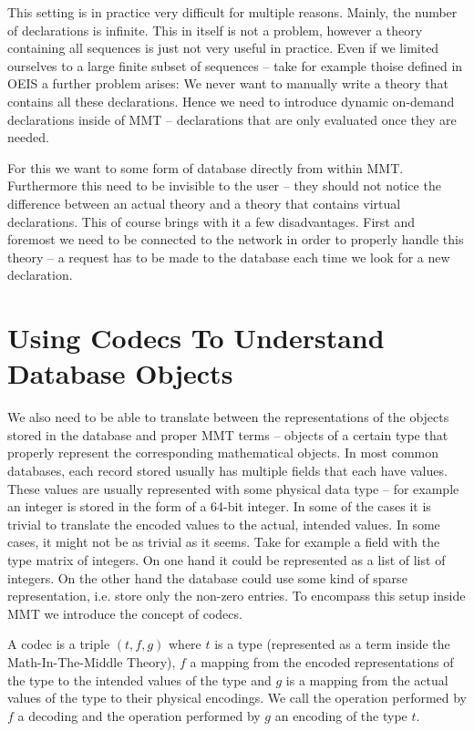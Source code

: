 \documentclass{deliverablereport}
\begin{document}
This setting is in practice very difficult for multiple reasons. Mainly, the number of declarations is infinite. This in itself is not a problem, however a theory containing all sequences is just not very useful in practice. Even if we limited ourselves to a large finite subset of sequences -- take for example thoise defined in OEIS  a further problem arises: We never want to manually write a theory that contains all these declarations. Hence we need to introduce dynamic on-demand declarations inside of MMT -- declarations that are only evaluated once they are needed.

For this we want to some form of database directly from within MMT. Furthermore this need to be invisible to the user -- they should not notice the difference between an actual theory and a theory that contains virtual declarations. This of course brings with it a few disadvantages. First and foremost we need to be connected to the network in order to properly handle this theory -- a request has to be made to the database each time we look for a new declaration.

\section{Using Codecs To Understand Database Objects}

We also need to be able to translate between the representations of the objects stored in the database and proper MMT terms -- objects of a certain type that properly represent the corresponding mathematical objects. In most common databases, each record stored usually has multiple fields that each have values. These values are usually represented with some physical data type -- for example an integer is stored in the form of a 64-bit integer. In some of the cases it is trivial to translate the encoded values to the actual, intended values. In some cases, it might not be as trivial as it seems. Take for example a field with the type matrix of integers. On one hand it could be represented as a list of list of integers. On the other hand the database could use some kind of sparse representation, i.e. store only the non-zero entries. To encompass this setup inside MMT we introduce the concept of codecs.

A codec is a triple $(t, f, g)$ where $t$ is a type (represented as a term inside the Math-In-The-Middle Theory), $f$ a mapping from the encoded representations of the type to the intended values of the type and $g$ is a mapping from the actual values of the type to their physical encodings. We call the operation performed by $f$ a decoding and the operation performed by $g$ an encoding of the type $t$.
\end{document}
